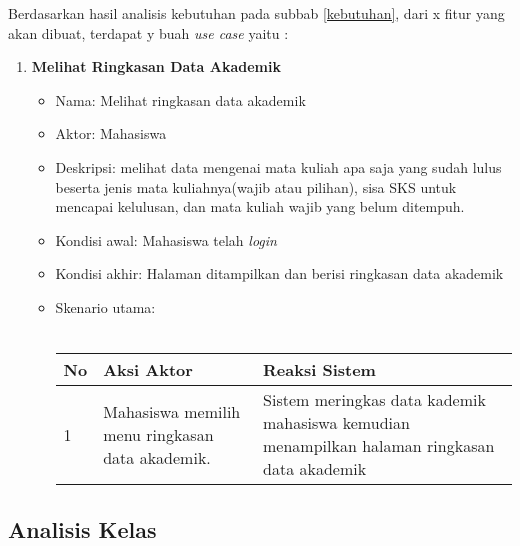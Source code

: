 Berdasarkan hasil analisis kebutuhan pada subbab \ref{kebutuhan}, dari x fitur yang akan dibuat, terdapat y buah \textit{use case} yaitu :
\begin{enumerate}
    \item \textbf{Melihat Ringkasan Data Akademik}
		\begin{itemize}
			\item Nama: Melihat ringkasan data akademik
			\item Aktor: Mahasiswa
			\item Deskripsi: melihat data mengenai mata kuliah apa saja yang sudah lulus beserta jenis mata kuliahnya(wajib atau pilihan), sisa SKS untuk mencapai kelulusan, dan mata kuliah wajib yang belum ditempuh. 
			\item Kondisi awal: Mahasiswa telah \textit{login}
			\item Kondisi akhir: Halaman ditampilkan dan berisi ringkasan data akademik
			\item Skenario utama: \\ \\
			\begin{tabular}{|p{0.5cm} |p{6cm}| p{6cm}|}
						\hline
							No 	& Aksi Aktor & Reaksi Sistem \\ \hline
							1 	& Mahasiswa memilih menu ringkasan data akademik. 	&	Sistem meringkas data kademik mahasiswa kemudian menampilkan halaman ringkasan data akademik \\ \hline 
						\end{tabular} 
		\end{itemize}
\end{enumerate}



\subsection{Analisis Kelas}






